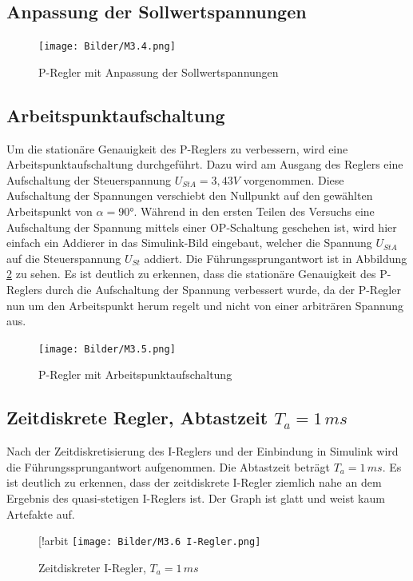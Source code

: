 \documentclass{report}
\begin{document}
\subsection{Anpassung der Sollwertspannungen}

\begin{figure}[H]
	\centering
	\texttt{[image: Bilder/M3.4.png]}
	\caption{P-Regler mit Anpassung der Sollwertspannungen}
	\label{fig:M3.4.png}
\end{figure}


\subsection{Arbeitspunktaufschaltung}

Um die stationäre Genauigkeit des P-Reglers zu verbessern, wird eine Arbeitspunktaufschaltung durchgeführt. Dazu wird am Ausgang des Reglers eine Aufschaltung der Steuerspannung $U_{StA} = 3,43V$ vorgenommen. Diese Aufschaltung der Spannungen verschiebt den Nullpunkt auf den gewählten Arbeitspunkt von $\alpha = 90°$. Während in den ersten Teilen des Versuchs eine Aufschaltung der Spannung mittels einer OP-Schaltung geschehen ist, wird hier einfach ein Addierer in das Simulink-Bild eingebaut, welcher die Spannung $U_{StA}$ auf die Steuerspannung $U_{St}$ addiert. Die Führungssprungantwort ist in Abbildung \ref{fig:M3.5.png} zu sehen. Es ist deutlich zu erkennen, dass die stationäre Genauigkeit des P-Reglers durch die Aufschaltung der Spannung verbessert wurde, da der P-Regler nun um den Arbeitspunkt herum regelt und nicht von einer arbiträren Spannung aus.


\begin{figure}[!ht]
	\centering
	\texttt{[image: Bilder/M3.5.png]}
	\caption{P-Regler mit Arbeitspunktaufschaltung}
	\label{fig:M3.5.png}
\end{figure}

\subsection{Zeitdiskrete Regler, Abtastzeit $T_a=1\,ms$}
Nach der Zeitdiskretisierung des I-Reglers und der Einbindung in Simulink wird die Führungssprungantwort aufgenommen. Die Abtastzeit beträgt $T_a=1\,ms$. Es ist deutlich zu  erkennen, dass der zeitdiskrete I-Regler ziemlich nahe an dem Ergebnis des quasi-stetigen I-Reglers ist. Der Graph ist glatt und weist kaum Artefakte auf.

\begin{figure}[!arbit            \centering
	\texttt{[image: Bilder/M3.6 I-Regler.png]}
	\caption{Zeitdiskreter I-Regler, $T_a=1\,ms$}
	\label{fig:m36iregler}
\end{figure}
\end{document}
